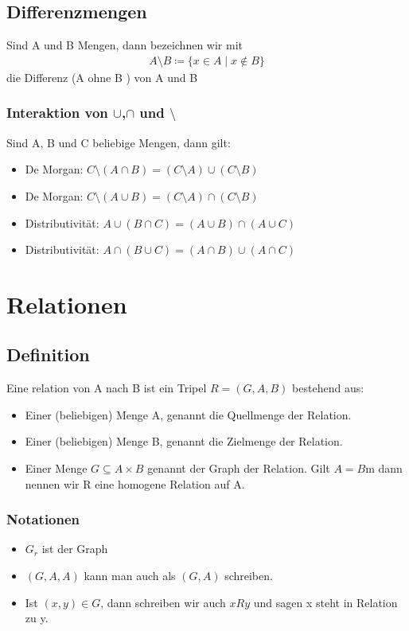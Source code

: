 \subsection{Differenzmengen}
Sind A und B Mengen, dann bezeichnen wir mit
\begin{align*}
    A \setminus B \coloneqq \{x \in A \mid x \notin B\}
\end{align*}
die Differenz (A ohne B ) von A und B
\subsubsection{Interaktion von $\cup$,$\cap$ und $\setminus$}
Sind A, B und C beliebige Mengen, dann gilt:
\begin{itemize}
    \item De Morgan: $C \setminus (A \cap B) = (C \setminus A) \cup (C \setminus B)$
    \item De Morgan: $C \setminus (A \cup B) = (C \setminus A) \cap (C \setminus B)$
    \item Distributivität: $A \cup (B \cap C) = (A \cup B) \cap (A \cup C)$
    \item Distributivität: $A \cap (B \cup C) = (A \cap B) \cup (A \cap C)$
\end{itemize}
\section{Relationen}
\subsection{Definition}
Eine relation von A nach B ist ein Tripel $R = (G,A,B)$ bestehend aus:
\begin{itemize}
    \item Einer (beliebigen) Menge A, genannt die Quellmenge der Relation.
    \item Einer (beliebigen) Menge B, genannt die Zielmenge der
    Relation.
    \item Einer Menge $G \subseteq A \times B$ genannt der Graph der Relation. Gilt $A = B$m dann 
    nennen wir R eine homogene Relation auf A.
\end{itemize}
\subsubsection{Notationen}
\begin{itemize}
    \item $G_r$ ist der Graph
    \item $(G,A,A)$ kann man auch als $(G,A)$ schreiben.
    \item Ist $(x,y) \in G$, dann schreiben wir auch $xRy$ und sagen x steht in Relation zu y.
\end{itemize}
